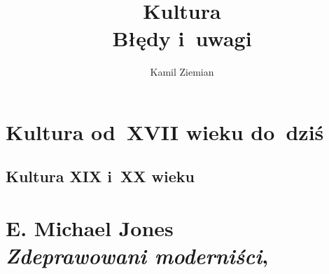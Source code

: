\documentclass[a4paper,11pt]{article}
\title{Kultura \\
  {\Large Błędy i~uwagi}}
\author{Kamil Ziemian}
\numberwithin{equation}{section}
\begin{document}





\maketitle  %





\section{Kultura od~XVII wieku do~dziś}

\VerSpaceTwo










\subsection{Kultura XIX i~XX wieku}

\VerSpaceTwo



\section{ %
  E. Michael Jones \\
  \textit{Zdeprawowani moderniści},
  \cite{EMichaelJonesZdeprawowaniModernisci2014}}


\end{document}
